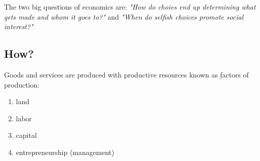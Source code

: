 \documentclass[12pt]{article}
\begin{document}
The two big questions of economics are:
\textit{"How do choies end up determining what gets made and whom it goes to?"} and
\textit{"When do selfish choices promote social interest?"}

\subsection{How?}
Goods and services are produced with productive resources known as \b{factors of production}:
\begin{enumerate}
    \item land
    \item labor
    \item capital
    \item entrepreneurship (management)
\end{enumerate}
\end{document}
